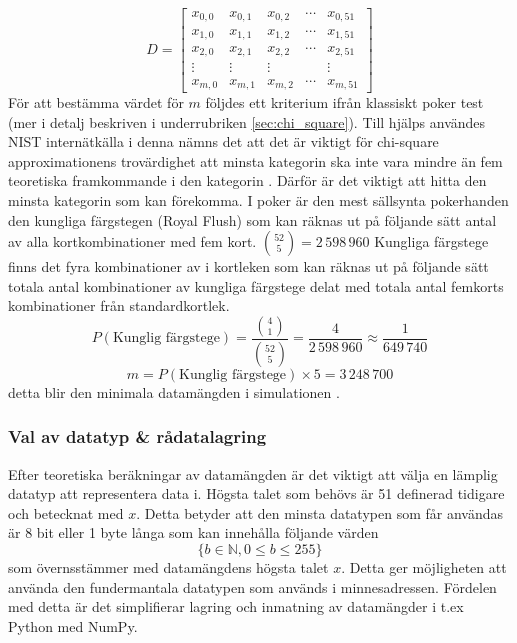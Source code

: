 \documentclass[swedish,a4paper]{article}
\begin{document}
\begin{equation*}
	D = \begin{bmatrix}
		x_{0,0} & x_{0,1} & x_{0,2} & \cdots & x_{0,51}\\ 
		x_{1,0} & x_{1,1} & x_{1,2} & \cdots & x_{1,51}\\
		x_{2,0} & x_{2,1} & x_{2,2} & \cdots & x_{2,51}\\
		\vdots & \vdots & \vdots & \; & \vdots \\
		x_{m,0} & x_{m,1} & x_{m,2} & \cdots & x_{m,51}
	\end{bmatrix}
\end{equation*}
För att bestämma värdet för $m$ följdes ett kriterium ifrån klassiskt
poker test (mer i  detalj beskriven i underrubriken
\ref{sec:chi_square}).
Till hjälps användes NIST internätkälla   i
denna nämns det att det är viktigt för chi-square approximationens trovärdighet
att minsta kategorin ska inte vara mindre än fem teoretiska framkommande i den
kategorin \parencite{nist}. Därför är det
viktigt att hitta den minsta kategorin som kan förekomma. I poker är den mest
sällsynta pokerhanden den kungliga färgstegen (Royal Flush) som kan räknas ut på
följande sätt antal av alla kortkombinationer med fem kort. $\binom{52}{5} =
2\,598\,960$ Kungliga färgstege finns det fyra  kombinationer av i kortleken
som kan räknas ut på följande sätt totala antal kombinationer av kungliga
färgstege delat med totala antal femkorts kombinationer från standardkortlek.
$$ P(\text{Kunglig färgstege}) =  \frac{\binom{4}{1}}{\binom{52}{5}} =
\frac{4}{2\,598\,960} \approx \frac{1}{649\,740} $$ $$m = P(\text{Kunglig
färgstege})  \times 5 = 3\,248\,700$$ detta blir den minimala datamängden i simulationen
.

\subsubsection{Val av datatyp \& rådatalagring} 
Efter teoretiska beräkningar av
datamängden är det viktigt att välja en lämplig datatyp att representera data i.
Högsta talet som behövs är 51 definerad tidigare och betecknat med $x$. Detta
betyder att den minsta datatypen som får användas är 8 bit eller 1 byte långa som
kan  innehålla följande värden $$\{b \in \mathbb{N},  0 \leq b \leq 255 \}$$ som
överns\-stämmer med datamängdens högsta talet $x$. Detta ger möjligheten att
använda den  fundermantala datatypen som används i minnesadressen. Fördelen med
detta är det simplifierar lagring och inmatning av datamängder i t.ex Python
med NumPy.
\end{document}
